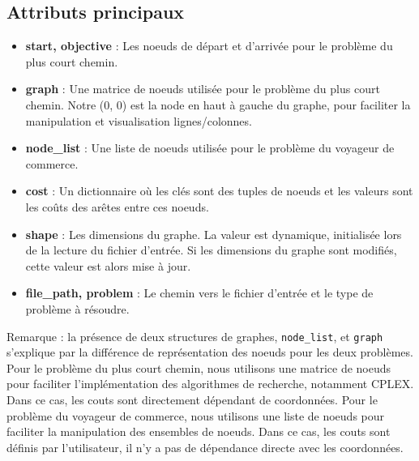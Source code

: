 \subsection{Attributs principaux}
\begin{itemize}
    \item \textbf{start, objective} : Les noeuds de départ et d'arrivée pour le problème du plus court chemin.
    \item \textbf{graph} : Une matrice de noeuds utilisée pour le problème du plus court chemin. Notre (0, 0) est la node en haut à gauche du graphe, pour faciliter la manipulation et visualisation lignes/colonnes.
    \item \textbf{node\_list} : Une liste de noeuds utilisée pour le problème du voyageur de commerce.
    \item \textbf{cost} : Un dictionnaire où les clés sont des tuples de noeuds et les valeurs sont les coûts des arêtes entre ces noeuds.
    \item \textbf{shape} : Les dimensions du graphe. La valeur est dynamique, initialisée lors de la lecture du fichier d'entrée. Si les dimensions du graphe sont modifiés, cette valeur est alors mise à jour.
    \item \textbf{file\_path, problem} : Le chemin vers le fichier d'entrée et le type de problème à résoudre.
\end{itemize}

Remarque : la présence de deux structures de graphes, \texttt{node\_list}, et \texttt{graph} s'explique par la différence de représentation des noeuds pour les deux problèmes. Pour le problème du plus court chemin, nous utilisons une matrice de noeuds pour faciliter l'implémentation des algorithmes de recherche, notamment CPLEX. Dans ce cas, les couts sont directement dépendant de coordonnées. Pour le problème du voyageur de commerce, nous utilisons une liste de noeuds pour faciliter la manipulation des ensembles de noeuds. Dans ce cas, les couts sont définis par l'utilisateur, il n'y a pas de dépendance directe avec les coordonnées.

